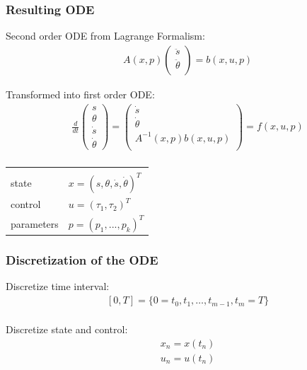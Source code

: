 \begin{frame}[c]
	\frametitle{Resulting ODE}
	
	Second order ODE from Lagrange Formalism:
	\begin{align*}
	  &A(x,p)
	  \begin{pmatrix} 
	    \ddot{s} \\ \ddot{\theta} \\
	  \end{pmatrix}
	  = b(x,u,p)
	\end{align*}
	
	Transformed into first order ODE:
	\begin{align*}
	  &\frac{d}{dt}
	  \begin{pmatrix}
	  s \\ \theta \\ \dot{s} \\ \dot{\theta}
	  \end{pmatrix}
	  =
	  \begin{pmatrix}
	    \dot{s} \\ \dot{\theta} \\ A^{-1}(x,p)b(x,u,p) \\
	  \end{pmatrix} 
	  = f(x,u,p) \\
	\end{align*}
	
	\vspace{-1.0cm}
	
	\begin{tabular}{ll}
	  & \\
	  state & $ x = (s,\theta,\dot{s},\dot{\theta})^T $ \\
	  control & $ u = (\tau_1,\tau_2)^T $ \\
	  parameters & $ p = (p_1,...,p_k)^T $ \\
	\end{tabular}
\end{frame}

\begin{frame}
	\frametitle{Discretization of the ODE}
	
	
	Discretize time interval:
	\begin{align*}
	  &[0,T] = \{ 0=t_0, t_1, \dots, t_{m-1}, t_{m}=T \} \\
	\end{align*}
	
	Discretize state and control:
	\begin{align*}
	  &x_n = x(t_n) \\
	  &u_n = u(t_n) \\
	\end{align*}
	
\end{frame}


